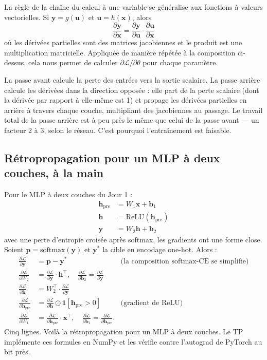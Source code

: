 La règle de la chaîne du calcul à une variable se généralise aux fonctions à valeurs vectorielles. Si $\bm{y} = g(\bm{u})$ et $\bm{u} = h(\bm{x})$, alors
\[
\frac{\partial \bm{y}}{\partial \bm{x}} = \frac{\partial \bm{y}}{\partial \bm{u}} \cdot \frac{\partial \bm{u}}{\partial \bm{x}}
\]
où les dérivées partielles sont des matrices jacobiennes et le produit est une multiplication matricielle. Appliquée de manière répétée à la composition ci-dessus, cela nous permet de calculer $\partial \mathcal{L} / \partial \theta$ pour chaque paramètre.

\begin{intuition}
La passe avant calcule la perte des entrées vers la sortie scalaire. La passe arrière calcule les dérivées dans la direction opposée : elle part de la perte scalaire (dont la dérivée par rapport à elle-même est 1) et propage les dérivées partielles en arrière à travers chaque couche, multipliant des jacobiennes au passage. Le travail total de la passe arrière est à peu près le même que celui de la passe avant --- un facteur 2 à 3, selon le réseau. C'est pourquoi l'entraînement est faisable.
\end{intuition}

\subsection{Rétropropagation pour un MLP à deux couches, à la main}

Pour le MLP à deux couches du Jour 1 :
\begin{align*}
\bm{h}_{\text{pre}} &= W_1 \bm{x} + \bm{b}_1 \\
\bm{h} &= \mathrm{ReLU}(\bm{h}_{\text{pre}}) \\
\bm{y} &= W_2 \bm{h} + \bm{b}_2
\end{align*}
avec une perte d'entropie croisée après softmax, les gradients ont une forme close. Soient $\bm{p} = \mathrm{softmax}(\bm{y})$ et $\bm{y}^*$ la cible en encodage one-hot. Alors :
\begin{align*}
\frac{\partial \mathcal{L}}{\partial \bm{y}} &= \bm{p} - \bm{y}^* &\text{(la composition softmax-CE se simplifie)} \\
\frac{\partial \mathcal{L}}{\partial W_2} &= \frac{\partial \mathcal{L}}{\partial \bm{y}} \cdot \bm{h}^\top, \quad \frac{\partial \mathcal{L}}{\partial \bm{b}_2} = \frac{\partial \mathcal{L}}{\partial \bm{y}} \\
\frac{\partial \mathcal{L}}{\partial \bm{h}} &= W_2^\top \cdot \frac{\partial \mathcal{L}}{\partial \bm{y}} \\
\frac{\partial \mathcal{L}}{\partial \bm{h}_{\text{pre}}} &= \frac{\partial \mathcal{L}}{\partial \bm{h}} \odot \mathbf{1}[\bm{h}_{\text{pre}} > 0] &\text{(gradient de ReLU)} \\
\frac{\partial \mathcal{L}}{\partial W_1} &= \frac{\partial \mathcal{L}}{\partial \bm{h}_{\text{pre}}} \cdot \bm{x}^\top, \quad \frac{\partial \mathcal{L}}{\partial \bm{b}_1} = \frac{\partial \mathcal{L}}{\partial \bm{h}_{\text{pre}}}.
\end{align*}
Cinq lignes. Voilà la rétropropagation pour un MLP à deux couches. Le TP implémente ces formules en NumPy et les vérifie contre l'autograd de PyTorch au bit près.

